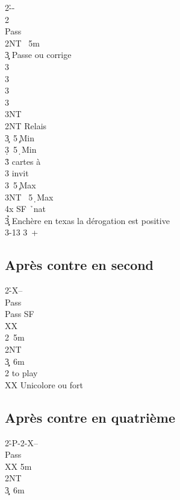 \documentclass[a4paper]{article}
\begin{document}
\begin{bidtable}
2\h--\+\\
2\s\+\\
Pass \s \\
2NT \s\ 5m\+\\
3\c\d \> Passe ou corrige\-\\
3\c\\
3\d\\
3\h\\
3\s\\
3NT\-\\
2NT \> Relais\+\\
3\c {}\s\ 5\c\ Min\\
3\d {}\s\ 5\d\ Min\\
3\h {} cartes à \s \+\\
3\s \> invit\-\\
3\s {}\s\ 5\c\ Max\\
3NT \s\ 5\d\ Max\\
4x \> SF \h\ nat\-\\
3\c\d\h \> Enchère en texas la dérogation est positive\\
3\s {}-13 3\s\ +\-
\end{bidtable}

\subsection{Après contre en second}

\begin{bidtable}
2\h-X--\+\\
Pass\+\\
Pass \> SF \h \\
XX \s \\
2\s {}\s\ 5m\\
2NT\\
3\c\d {}\s\ 6m\-\\
2\s \> to play\\
XX \> Unicolore ou fort\-
\end{bidtable}

\subsection{Après contre en quatrième}

\begin{bidtable}
2\h-P-2\s-X--\+\\
Pass \h \\
XX \s 5m\\
2NT\\
3\c\d {}\s\ 6m\-
\end{bidtable}
\end{document}
